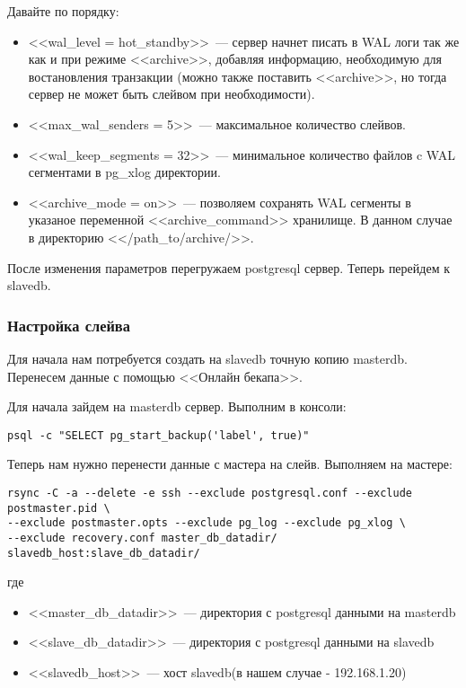 Давайте по порядку:
\begin{itemize}
\item <<wal\_level = hot\_standby>>~--- сервер начнет писать в WAL логи так же как и при режиме <<archive>>, 
добавляя информацию, необходимую для востановления транзакции (можно также поставить <<archive>>, 
но тогда сервер не может быть слейвом при необходимости).
\item <<max\_wal\_senders = 5>>~--- максимальное количество слейвов.
\item <<wal\_keep\_segments = 32>>~--- минимальное количество файлов c WAL сегментами в pg\_xlog директории.
\item <<archive\_mode = on>>~--- позволяем сохранять WAL сегменты в указаное переменной <<archive\_command>> хранилище. 
В данном случае в директорию <</path\_to/archive/>>.
\end{itemize}

После изменения параметров перегружаем postgresql сервер. Теперь перейдем к slavedb.

\subsubsection{Настройка слейва}
Для начала нам потребуется создать на slavedb точную копию masterdb. Перенесем данные с помощью <<Онлайн бекапа>>.

Для начала зайдем на masterdb сервер. Выполним в консоли:
\begin{lstlisting}[label=lst:streaming10,caption=Выполняем на мастере]
psql -c "SELECT pg_start_backup('label', true)" 
\end{lstlisting}

Теперь нам нужно перенести данные с мастера на слейв. Выполняем на мастере:
\begin{lstlisting}[label=lst:streaming11,caption=Выполняем на мастере]
rsync -C -a --delete -e ssh --exclude postgresql.conf --exclude postmaster.pid \
--exclude postmaster.opts --exclude pg_log --exclude pg_xlog \
--exclude recovery.conf master_db_datadir/ slavedb_host:slave_db_datadir/ 
\end{lstlisting}
где
\begin{itemize}
\item <<master\_db\_datadir>>~--- директория с postgresql данными на masterdb
\item <<slave\_db\_datadir>>~--- директория с postgresql данными на slavedb
\item <<slavedb\_host>>~--- хост slavedb(в нашем случае - 192.168.1.20)
\end{itemize}


